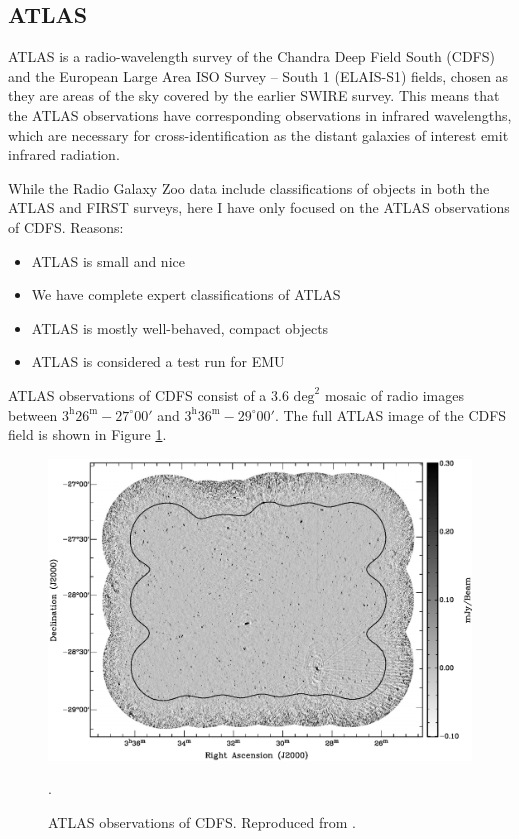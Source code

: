 \documentclass[a4paper]{article}
\newcommand{\fig}{Figure }
\begin{document}
    \subsection{ATLAS}

      ATLAS is a radio-wavelength survey of the Chandra Deep Field South (CDFS) and the European Large Area ISO Survey -- South 1 (ELAIS-S1) fields, chosen as they are areas of the sky covered by the earlier SWIRE survey. This means that the ATLAS observations have corresponding observations in infrared wavelengths\cite{franzen15}, which are necessary for cross-identification as the distant galaxies of interest emit infrared radiation.

      While the Radio Galaxy Zoo data include classifications of objects in both the ATLAS and FIRST surveys, here I have only focused on the ATLAS observations of CDFS. Reasons\cite{franzen15}:
      \begin{itemize}
        \item ATLAS is small and nice
        \item We have complete expert classifications of ATLAS
        \item ATLAS is mostly well-behaved, compact objects
        \item ATLAS is considered a test run for EMU
      \end{itemize}

      ATLAS observations of CDFS consist of a $3.6 \text{ deg}^2$ mosaic of radio images between $3^\text{h}26^\text{m}-27^\circ 00'$ and $3^\text{h}36^\text{m}-29^\circ 00'$. The full ATLAS image of the CDFS field is shown in \fig \ref{fig:cdfs}.

      \begin{figure}[!ht]
        \centering
        \includegraphics[width=0.8\linewidth,]{images/ATLAS-CDFS-cropped.pdf}
        \caption{ATLAS observations of CDFS. Reproduced from \citet{franzen15}.}.
        \label{fig:cdfs}
      \end{figure}
\end{document}
